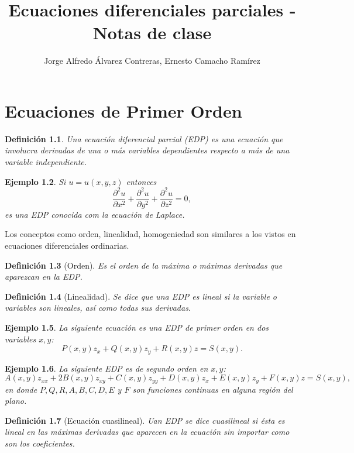 \documentclass[11pt,letterpaper]{report}
\title{Ecuaciones diferenciales parciales - Notas de clase}
\author{Jorge Alfredo Álvarez Contreras, Ernesto Camacho Ramírez}
\newtheorem{defn}{Definición}[chapter]
\newtheorem{example}[defn]{Ejemplo}
\newcommand\<{\langle}
\renewcommand\>{\rangle}
\begin{document}
\maketitle

\tableofcontents
\listoftodos

\chapter{Ecuaciones de Primer Orden}

\begin{defn}
  Una ecuación diferencial parcial (EDP) es una ecuación 
  que involucra derivadas de una o más variables dependientes 
  respecto a más de una variable independiente.
\end{defn}

\begin{example}
  Si $u = u(x,y,z)$ entonces
  \[
  \frac{\partial^2 u}{\partial x^2} + \frac{\partial^2 u}{\partial y^2} + \frac{\partial^2 u}{\partial z^2} = 0,
  \] es una EDP conocida com la ecuación de Laplace.
\end{example}

Los conceptos como orden, linealidad, homogeniedad son
similares a los vistos en ecuaciones diferenciales
ordinarias.

\begin{defn}[Orden]
  Es el orden de la máxima o máximas derivadas que aparezcan
  en la EDP.
\end{defn}

\begin{defn}[Linealidad]
  Se dice que una EDP es lineal si la variable o variables
  son \textit{lineales}, así como \textit{todas} sus
  derivadas.
\end{defn}

\begin{example}
  La siguiente ecuación es una EDP de primer orden en dos
  variables $x,y$:
  \[
    P(x,y) z_x + Q(x,y) z_y + R(x,y) z = S(x,y).
  \] 
\end{example}

\begin{example}
  La siguiente EDP es de segundo orden en $x,y$:
  \[
    A(x,y) z_{xx} + 2B(x,y) z_{xy} + C(x,y) z_{yy} + D(x,y)
    z_x + E(x,y) z_y + F(x,y) z = S(x,y),
  \] en donde $P,Q,R,A,B,C,D,E$ y $F$ son funciones
  continuas en alguna región del plano.
\end{example}

\begin{defn}[Ecuación cuasilineal]
  Uan EDP se dice cuasilineal si ésta es lineal en las
  máximas derivadas que aparecen en la ecuación sin importar
  como son los coeficientes.
\end{defn}
\end{document}
